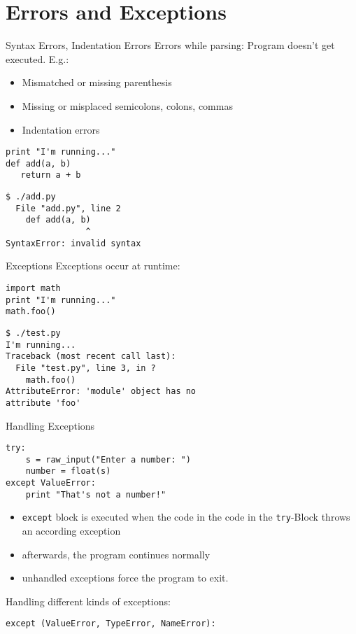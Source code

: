 \section{Errors and Exceptions}

\begin{frame}[fragile]{Syntax Errors, Indentation Errors}
Errors while parsing: \alert{Program doesn't get executed}. E.g.: 
\begin{itemize}
\item Mismatched or missing parenthesis
\item Missing or misplaced semicolons, colons, commas
\item Indentation errors
\end{itemize}
\begin{lstlisting}[style=Python]
print "I'm running..."
def add(a, b)
   return a + b
\end{lstlisting}
\begin{lstlisting}[style=Shell]
$ ./add.py
  File "add.py", line 2
    def add(a, b)
                ^
SyntaxError: invalid syntax
\end{lstlisting} %
\end{frame}

\begin{frame}[fragile]{Exceptions}
Exceptions occur at \alert{runtime}:
\begin{lstlisting}[style=Python]
import math
print "I'm running..."
math.foo()
\end{lstlisting}
\begin{lstlisting}[style=Shell]
$ ./test.py
I'm running...
Traceback (most recent call last):
  File "test.py", line 3, in ?
    math.foo()
AttributeError: 'module' object has no 
attribute 'foo'
\end{lstlisting} %
\end{frame}

\begin{frame}[fragile]{Handling Exceptions}
\begin{lstlisting}[style=Python]
try:
    s = raw_input("Enter a number: ")
    number = float(s)
except ValueError:
    print "That's not a number!"
\end{lstlisting}
\begin{itemize}
\item \lstinline{except} block is executed when the code in the code in the \lstinline{try}-Block throws an according exception
\item afterwards, the program continues normally
\item unhandled exceptions force the program to exit.
\end{itemize}
Handling different kinds of exceptions:
\begin{lstlisting}[style=Python]
except (ValueError, TypeError, NameError):
\end{lstlisting}
\end{frame}

